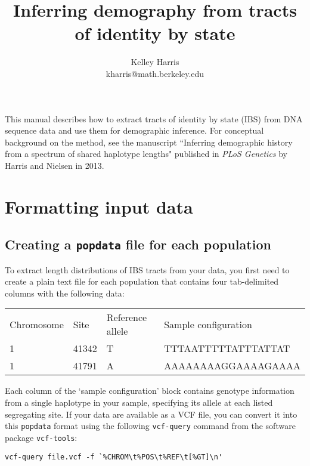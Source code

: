 \documentclass[12pt]{article}
\begin{document}
\title{Inferring demography from tracts of identity by state}
\author{Kelley Harris \\ kharris@math.berkeley.edu}
\date{}
\maketitle

\tableofcontents

This manual describes how to extract tracts of identity by state (IBS) from DNA sequence data and use them for demographic inference. For conceptual background on the method, see the manuscript ``Inferring demographic history from a spectrum of shared haplotype lengths" published in \emph{PLoS Genetics} by Harris and Nielsen in 2013.

\section{Formatting input data}
\subsection{Creating a \texttt{popdata} file for each population}

To extract length distributions of IBS tracts from your data, you first need to create a plain text file for each population that contains four tab-delimited columns with the following data:

\vspace{5 mm}

\begin{tabular}{llll}
Chromosome & Site & Reference allele & Sample configuration \\
1 & 41342 & T & TTTAATTTTTATTTATTAT \\
1 & 41791 & A & AAAAAAAAGGAAAAGAAAA
\end{tabular}

\vspace{5 mm}

Each column of the `sample configuration' block contains genotype information from a single haplotype in your sample, specifying its allele at each listed segregating site. If your data are available as a VCF file, you can convert it into this \texttt{popdata} format using the following \texttt{vcf-query} command from the software package \texttt{vcf-tools}:

\begin{verbatim}
vcf-query file.vcf -f `%CHROM\t%POS\t%REF\t[%GT]\n'
\end{verbatim}
\end{document}
